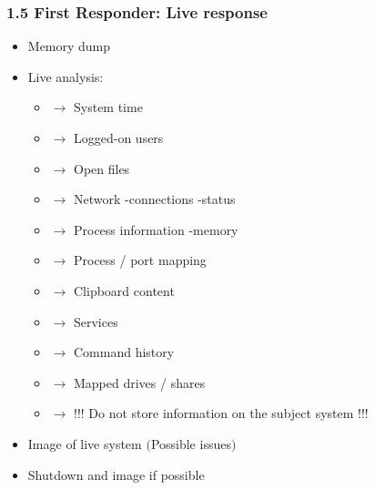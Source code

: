 \begin{frame}
  \frametitle{1.5 First Responder: Live response}
  \begin{itemize}
      \item Memory dump
      \item Live analysis:
      \begin{itemize}
          \item[] $\to$ System time
          \item[] $\to$ Logged-on users
          \item[] $\to$ Open files
          \item[] $\to$ Network -connections -status
          \item[] $\to$ Process information -memory
          \item[] $\to$ Process / port mapping
          \item[] $\to$ Clipboard content
          \item[] $\to$ Services
          \item[] $\to$ Command history
          \item[] $\to$ Mapped drives / shares
          \item[] $\to$ !!! Do not store information on the subject system !!!
      \end{itemize}
      \item Image of live system $($Possible issues$)$
      \item Shutdown and image if possible
  \end{itemize}
\end{frame}


